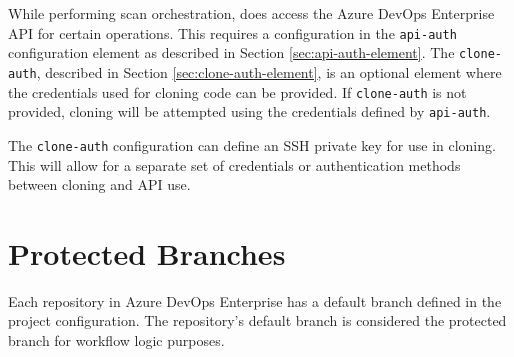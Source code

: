 While performing scan orchestration, \cxoneflow does access the Azure DevOps Enterprise API for
certain operations.  This requires a configuration in the \texttt{api-auth} configuration
element as described in Section \ref{sec:api-auth-element}.  The \texttt{clone-auth},
described in Section \ref{sec:clone-auth-element}, is an optional element where the credentials
used for cloning code can be provided.  If \texttt{clone-auth} is not provided, cloning will
be attempted using the credentials defined by \texttt{api-auth}.

The \texttt{clone-auth} configuration can define an SSH private key for use in cloning.  This
will allow for a separate set of credentials or authentication methods between cloning and
API use.

\section{Protected Branches}

Each repository in Azure DevOps Enterprise has a default branch defined in the project
configuration.  The repository's default branch is considered the protected branch for
workflow logic purposes.